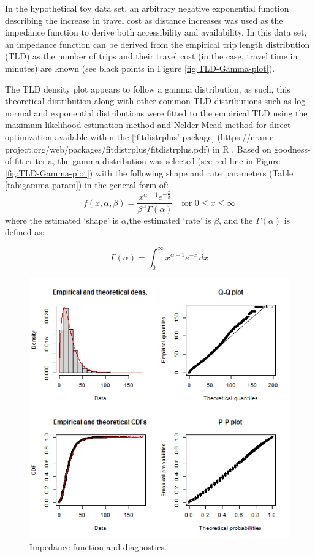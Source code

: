 \documentclass[]{elsarticle} %
\begin{document}
In the hypothetical toy data set, an arbitrary negative exponential
function describing the increase in travel cost as distance increases
was used as the impedance function to derive both accessibility and
availability. In this data set, an impedance function can be derived
from the empirical trip length distribution (TLD) as the number of trips
and their travel cost (in the case, travel time in minutes) are known
(see black points in Figure \ref{fig:TLD-Gamma-plot}).

The TLD density plot appears to follow a gamma distribution, as such,
this theoretical distribution along with other common TLD distributions
such as log-normal and exponential distributions were fitted to the
empirical TLD using the maximum likelihood estimation method and
Nelder-Mead method for direct optimization available within the
{[}`fitdistrplus' package{]}
(https://cran.r-project.org/web/packages/fitdistrplus/fitdistrplus.pdf)
in R . Based on goodness-of-fit criteria, the gamma distribution was
selected (see red line in Figure \ref{fig:TLD-Gamma-plot}) with the
following shape and rate parameters (Table \ref{tab:gamma-param}) in the
general form of: \[ 
f(x, \alpha, \beta) = \frac {x^{\alpha-1}e^{-\frac{x}{\beta}}}{ \beta^{\alpha}\Gamma(\alpha)} \quad \text{for } 0 \leq x \leq \infty
\] \noindent where the estimated `shape' is \(\alpha\),the estimated
`rate' is \(\beta\), and the \(\Gamma(\alpha)\) is defined as:

\[
\Gamma(\alpha) =  \int_{0}^{\infty} x^{\alpha-1}e^{-x} \,dx
\]

\begin{figure}
\includegraphics[width=1\linewidth]{images/impedance_function} \caption{\label{fig:impedance-function-plot}Impedance function and diagnostics.}\label{fig:plot-impedance-function}
\end{figure}
\end{document}
